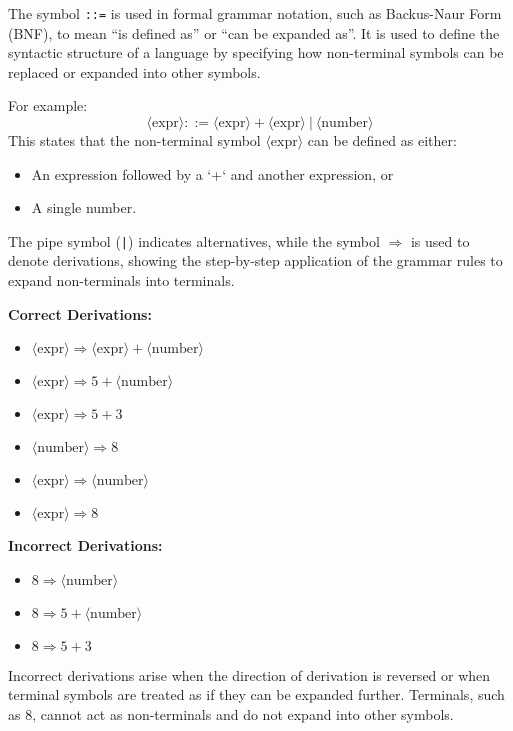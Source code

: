 \newpage

\begin{Def}[Symbol ``\texttt{::=}'']
    The symbol \texttt{::=} is used in formal grammar notation, such as Backus-Naur Form (BNF), 
    to mean ``is defined as'' or ``can be expanded as''. It is used to define the syntactic structure 
    of a language by specifying how non-terminal symbols can be replaced or expanded into other symbols.

    \vspace{1em}
    \noindent
    For example:
    \[
    \langle \text{expr} \rangle ::= \langle \text{expr} \rangle + \langle \text{expr} \rangle \ | \ \langle \text{number} \rangle
    \]
    This states that the non-terminal symbol $\langle \text{expr} \rangle$ can be defined as either:
    \begin{itemize}
        \item An expression followed by a `+` and another expression, or
        \item A single number.
    \end{itemize}

    \vspace{1em}
    The pipe symbol (\texttt{|}) indicates alternatives, while the symbol \(\Rightarrow\) is used to denote derivations, 
    showing the step-by-step application of the grammar rules to expand non-terminals into terminals.

    \vspace{1em}
    \noindent
    \textbf{Correct Derivations:}
    \begin{itemize}
        \item $\langle \text{expr} \rangle \Rightarrow \langle \text{expr} \rangle + \langle \text{number} \rangle$
        \item $\langle \text{expr} \rangle \Rightarrow 5 + \langle \text{number} \rangle$
        \item $\langle \text{expr} \rangle \Rightarrow 5 + 3$
        \item $\langle \text{number} \rangle \Rightarrow 8$
        \item $\langle \text{expr} \rangle \Rightarrow \langle \text{number} \rangle$
        \item $\langle \text{expr} \rangle \Rightarrow 8$
    \end{itemize}

    \vspace{1em}
    \noindent
    \textbf{Incorrect Derivations:}
    \begin{itemize}
        \item $8 \Rightarrow \langle \text{number} \rangle$ 
        \item $8 \Rightarrow 5 + \langle \text{number} \rangle$
        \item $8 \Rightarrow 5 + 3$
    \end{itemize}

    \vspace{1em}
    Incorrect derivations arise when the direction of derivation is reversed or when terminal symbols are treated as if they 
    can be expanded further. Terminals, such as $8$, cannot act as non-terminals and do not expand into other symbols.
\end{Def}
